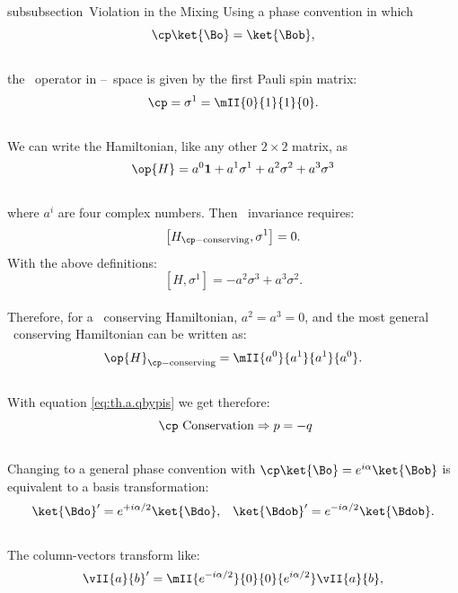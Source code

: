 subsubsection{\cp\ Violation in the Mixing}
\label{sec:th.a.cpinmixing}
 Using a phase convention in which
\begin{equation}
\cp \ket{\Bo} = \ket{\Bob},
\end{equation}\\
 the \cp\ operator in \Bo--\Bob\ space is given by the first Pauli spin
 matrix:
\begin{equation}
\cp = \sigma^1 = \mII{ 0 }{ 1 }{
                       1 }{ 0 }
.
\end{equation}\\
 We can write the Hamiltonian, like any other $2\times 2$ matrix, as
\begin{equation}
\op{H} = a^0 \mathbf{1} + a^1 \sigma^1 + a^2 \sigma^2 + a^3 \sigma^3
\end{equation}\\
where $a^i$ are four complex numbers. Then \cp\ invariance requires:
\begin{equation}
\left[H_{\mathrm{\cp-conserving}},\sigma^1\right] = 0
.
\end{equation}
With the above definitions:
\begin{equation}
\left[H,\sigma^1\right] = - a^2 \sigma^3 +  a^3 \sigma^2
.
\end{equation}\\
Therefore, for a \cp\ conserving Hamiltonian, $a^2 = a^3 = 0$, and the
most general \cp\ conserving Hamiltonian can be written as:
\begin{equation}
\op{H}_{\mathrm{\cp-conserving}} = \mII{  a^0  }{  a^1  }{
                                          a^1  }{  a^0  }
.
\end{equation}\\
With equation \ref{eq:th.a.qbypis} we get therefore:
\begin{equation}
\mbox{ \cp\ Conservation} \Rightarrow p = -q
\end{equation}\\
 Changing to a general phase convention with
$\cp \ket{\Bo} = e^{i\alpha} \ket{\Bob}$
 is equivalent to a basis transformation:
\begin{equation}
\ket{\Bdo}^{\prime} = e^{+i\alpha/2}\ket{\Bdo},\;\;\;
\ket{\Bdob}^{\prime} = e^{-i\alpha/2}\ket{\Bdob}
.
\end{equation}\\
The column-vectors transform like:
\begin{equation}
\vII{a}{b}^{\prime} = 
\mII{ e^{-i\alpha/2} }{ 0 }{ 0 }{ e^{ i\alpha/2} }
\vII{a}{b}
,
\end{equation}\\
